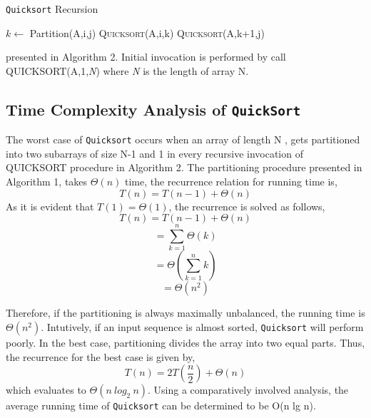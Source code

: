 \documentclass[a4paper, 10pt,twocolumn]{article}
\begin{document}
\begin{algorithm}
  \caption{\texttt{Quicksort} Recursion}
  \label{algo:ins_sort1}
  \begin{algorithmic}[1]
     \newline
        \State $k \leftarrow$ Partition(A,i,j)
        \State \textsc{Quicksort}(A,i,k)
        \State \textsc{Quicksort}(A,k+1,j)
      \EndIf
     \EndProcedure
  \end{algorithmic}
\end{algorithm}

presented in Algorithm 2.
Initial invocation is performed by call QUICKSORT(A,1,\textit{N}) where \textit{N} is the
length of array N.

\subsection{Time Complexity Analysis of \texttt{QuickSort}}

The worst case of \texttt{Quicksort} occurs when an array of
length N , gets partitioned into two subarrays
of size N-1 and 1 in every recursive invocation of
QUICKSORT procedure in Algorithm 2. The partitioning
procedure presented in Algorithm 1, takes $\Theta(n)$
time, the recurrence relation for running time is,
$$ T(n)=T(n-1)+\Theta(n)$$
As it is evident that $T(1) = \Theta(1)$, the recurrence is
solved as follows,
$$ T(n)=T(n-1)+\Theta(n)$$
$$ = \sum_{k=1}^{n} \Theta(k) $$
$$ = \Theta\left(\sum_{k=1}^{n} k\right) $$
$$ = \Theta(n^2) $$
\par
Therefore, if the partitioning is always maximally unbalanced,
the running time is $\Theta(n^2)$. Intutively, if an input sequence
is almost sorted, \texttt{Quicksort} will perform poorly. In the best case,
partitioning divides the array into two equal parts. Thus, the
recurrence for the best case is given by,
$$ T(n) = 2T\left(\frac{n}{2}\right) + \Theta(n)  $$
which evaluates to $\Theta(n\:log_2\:n)$. Using a comparatively involved
analysis, the average running time of \texttt{Quicksort} can be determined to
be O(n lg n).
\end{document}
